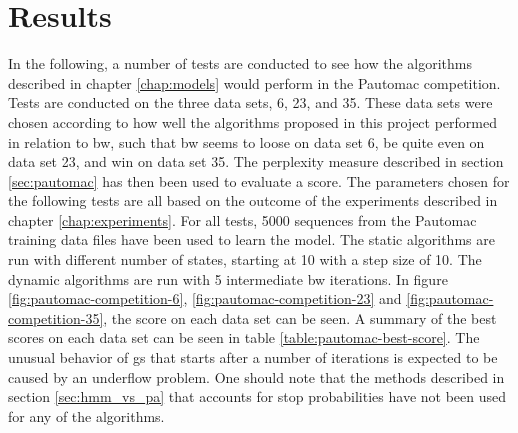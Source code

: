\chapter{Results}
\label{chap:results}
In the following, a number of tests are conducted to see how the algorithms described in chapter \ref{chap:models} would perform in the Pautomac competition. Tests are conducted on the three data sets, 6, 23, and 35. These data sets were chosen according to how well the algorithms proposed in this project performed in relation to \gls{bw}, such that \gls{bw} seems to loose on data set 6, be quite even on data set 23, and win on data set 35.
The perplexity measure described in section \ref{sec:pautomac} has then been used to evaluate a score.
The parameters chosen for the following tests are all based on the outcome of the experiments described in chapter \ref{chap:experiments}.
For all tests, 5000 sequences from the Pautomac training data files have been used to learn the model. The static algorithms are run with different number of states, starting at 10 with a step size of 10.
The dynamic algorithms are run with 5 intermediate \gls{bw} iterations.
In figure \ref{fig:pautomac-competition-6}, \ref{fig:pautomac-competition-23} and \ref{fig:pautomac-competition-35}, the score on each data set can be seen.
A summary of the best scores on each data set can be seen in table \ref{table:pautomac-best-score}.
The unusual behavior of \gls{gs} that starts after a number of iterations is expected to be caused by an underflow problem.
One should note that the methods described in section \ref{sec:hmm_vs_pa} that accounts for stop probabilities have not been used for any of the algorithms.


